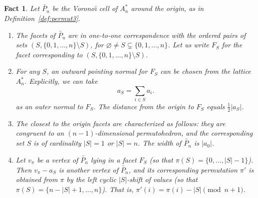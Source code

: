 \documentclass[12pt,a4paper,oneside]{amsart}
\newtheorem{fact}[theorem]{Fact}
\theoremstyle{definition}
\theoremstyle{remark}
\numberwithin{equation}{section}
\begin{document}
\begin{fact}
\label{fact:combifacet}
Let $\widetilde{P_n}$ be the Vorono\u{\i} cell of $A_n^*$ around the origin, as in Definition~\ref{def:permut3}.
\begin{enumerate}
\item The facets of $\widetilde{P_n}$ are in one-to-one correspondence with the ordered pairs of sets $(S, \{0,1,\ldots,n\}\setminus S)$, for $\varnothing \neq S \subsetneq \{0,1,\ldots,n\}$. Let us write $F_S$ for the facet corresponding to $(S, \{0,1,\ldots,n\}\setminus S)$.

\item For any $S$, an outward pointing normal for $F_S$ can be chosen from the lattice $A_n^*$. Explicitly, we can take
 $$
 a_S = \sum_{i \in S} a_i.
 $$
 as an outer normal to $F_S$. The distance from the origin to $F_S$ equals $\frac{1}{2} |a_S|$.

\item The closest to the origin facets are characterized as follows: they are congruent to an $(n-1)$-dimensional permutohedron, and the corresponding set $S$ is of cardinality $|S|=1$ or $|S|=n$. The width of $\widetilde{P_n}$ is $|a_0|$.

\item Let $v_\pi$ be a vertex of $\widetilde{P_n}$ lying in a facet $F_S$ (so that $\pi(S) = \{0, \ldots, |S|-1\}$). Then $v_\pi-a_S$ is another vertex of $\widetilde{P_n}$, and its corresponding permutation $\pi'$ is obtained from $\pi$ by the left cyclic $|S|$-shift of values (so that $\pi(S) = \{n - |S| + 1, \ldots, n\}$). That is, $\pi'(i) = \pi(i) - |S| \pmod{n+1}$.


\end{enumerate}
\end{fact}
\end{document}
